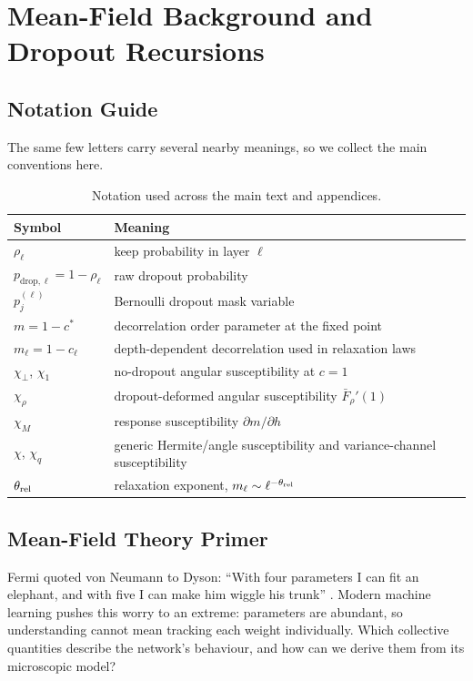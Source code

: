\section{Mean-Field Background and Dropout Recursions}

\subsection{Notation Guide}
\label{app:notation}

The same few letters carry several nearby meanings, so we collect the main conventions here.
\begin{table}[h]
\caption{Notation used across the main text and appendices.}
\label{tab:notation_guide}
\centering
\small
\begin{tabular}{@{}ll@{}}
\toprule
Symbol & Meaning \\
\midrule
\(\rho_\ell\) & keep probability in layer \(\ell\) \\
\(p_{\mathrm{drop},\ell}=1-\rho_\ell\) & raw dropout probability \\
\(p_j^{(\ell)}\) & Bernoulli dropout mask variable \\
\(m=1-c^\ast\) & decorrelation order parameter at the fixed point \\
\(m_\ell=1-c_\ell\) & depth-dependent decorrelation used in relaxation laws \\
\(\chi_\perp\), \(\chi_1\) & no-dropout angular susceptibility at \(c=1\) \\
\(\chi_\rho\) & dropout-deformed angular susceptibility \(\bar F_\rho'(1)\) \\
\(\chi_M\) & response susceptibility \(\partial m/\partial h\) \\
\(\chi\), \(\chi_q\) & generic Hermite/angle susceptibility and variance-channel susceptibility \\
\(\theta_{\rm rel}\) & relaxation exponent, \(m_\ell\sim \ell^{-\theta_{\rm rel}}\) \\
\bottomrule
\end{tabular}
\end{table}
\FloatBarrier

\subsection{Mean-Field Theory Primer}
\label{app:mft_primer}

Fermi quoted von Neumann to Dyson: ``With four parameters I can fit an elephant, and with five I can make him wiggle his trunk'' \cite{Dyson2004Fermi}. Modern machine learning pushes this worry to an extreme: parameters are abundant, so understanding cannot mean tracking each weight individually. Which collective quantities describe the network's behaviour, and how can we derive them from its microscopic model?

